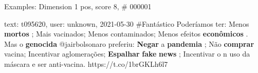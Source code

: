 \begin{frame}{Examples: Dimension 1 pos, score 8, \# 000001}
\footnotesize
\begin{exampleblock}{text: t095620, user: unknown, 2021-05-30}
\#Fantástico Poderíamos ter: Menos \textbf{mortos} ; Mais vacinados; Menos 
contaminados; Menos efeitos \textbf{econômicos} . Mas o \textbf{genocida} 
@jairbolsonaro preferiu: \textbf{Negar} a \textbf{pandemia} ; Não 
\textbf{comprar} vacina; Incentivar aglomerações; \textbf{Espalhar} 
\textbf{fake} \textbf{news} ; Incentivar o n uso da máscara e ser anti-vacina. 
https://t.co/1brGKLh6l7 
\end{exampleblock}
\end{frame}
